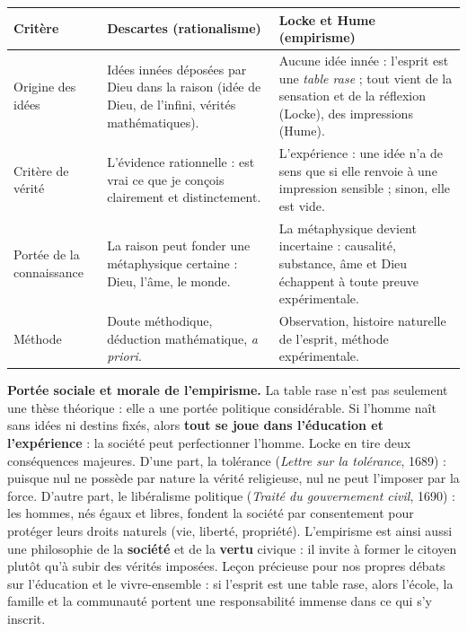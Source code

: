 \documentclass[11pt]{article}
\newcommand{\cle}[1]{{\popxbold\color{popdark}#1}}
\begin{document}
\begin{center}
\begin{tabularx}{\linewidth}{|l|X|X|}
\hline
\rowcolor{popblueL} \textbf{Critère} & \textbf{Descartes (rationalisme)} & \textbf{Locke et Hume (empirisme)} \\
\hline
Origine des idées & Idées innées déposées par Dieu dans la raison (idée de Dieu, de l'infini, vérités mathématiques). & Aucune idée innée : l'esprit est une \emph{table rase} ; tout vient de la sensation et de la réflexion (Locke), des impressions (Hume). \\
\hline
Critère de vérité & L'évidence rationnelle : est vrai ce que je conçois clairement et distinctement. & L'expérience : une idée n'a de sens que si elle renvoie à une impression sensible ; sinon, elle est vide. \\
\hline
Portée de la connaissance & La raison peut fonder une métaphysique certaine : Dieu, l'âme, le monde. & La métaphysique devient incertaine : causalité, substance, âme et Dieu échappent à toute preuve expérimentale. \\
\hline
Méthode & Doute méthodique, déduction mathématique, \emph{a priori}. & Observation, histoire naturelle de l'esprit, méthode expérimentale. \\
\hline
\end{tabularx}
\end{center}

\textbf{Portée sociale et morale de l'empirisme.} La table rase n'est pas seulement une thèse théorique : elle a une portée politique considérable. Si l'homme naît sans idées ni destins fixés, alors \textbf{tout se joue dans l'éducation et l'expérience} : la société peut perfectionner l'homme. Locke en tire deux conséquences majeures. D'une part, la \cle{tolérance} (\emph{Lettre sur la tolérance}, 1689) : puisque nul ne possède par nature la vérité religieuse, nul ne peut l'imposer par la force. D'autre part, le \cle{libéralisme politique} (\emph{Traité du gouvernement civil}, 1690) : les hommes, nés égaux et libres, fondent la société par consentement pour protéger leurs droits naturels (vie, liberté, propriété). L'empirisme est ainsi aussi une philosophie de la \textbf{société} et de la \textbf{vertu} civique : il invite à former le citoyen plutôt qu'à subir des vérités imposées. Leçon précieuse pour nos propres débats sur l'éducation et le vivre-ensemble : si l'esprit est une table rase, alors l'école, la famille et la communauté portent une responsabilité immense dans ce qui s'y inscrit.
\end{document}
